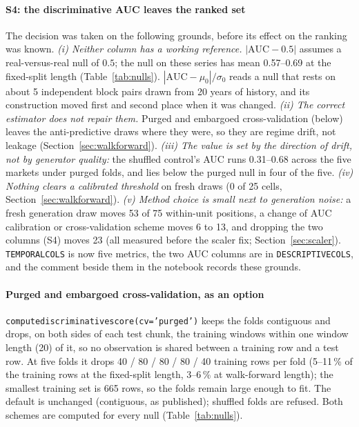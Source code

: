 \documentclass[11pt,a4paper]{article}
\makeatletter
\DeclareRobustCommand{\_}{\ifmmode\nfss@text{\textunderscore}\else\textunderscore\allowbreak\fi}
\makeatother
\begin{document}
\paragraph{S4: the discriminative AUC leaves the ranked set}\label{sec:s4} The decision was taken on the following grounds, before its effect on the ranking was known. \textit{(i) Neither column has a working reference.} $|\mathrm{AUC}-0.5|$ assumes a real-versus-real null of $0.5$; the null on these series has mean 0.57--0.69 at the fixed-split length (Table~\ref{tab:nulls}). $|\mathrm{AUC}-\mu_0|/\sigma_0$ reads a null that rests on about 5 independent block pairs drawn from 20 years of history, and its construction moved first and second place when it was changed. \textit{(ii) The correct estimator does not repair them.} Purged and embargoed cross-validation (below) leaves the anti-predictive draws where they were, so they are regime drift, not leakage (Section~\ref{sec:walkforward}). \textit{(iii) The value is set by the direction of drift, not by generator quality:} the shuffled control's AUC runs 0.31--0.68 across the five markets under purged folds, and lies below the purged null in four of the five. \textit{(iv) Nothing clears a calibrated threshold} on fresh draws (0 of 25 cells, Section~\ref{sec:walkforward}). \textit{(v) Method choice is small next to generation noise:} a fresh generation draw moves 53 of 75 within-unit positions, a change of AUC calibration or cross-validation scheme moves 6 to 13, and dropping the two columns (S4) moves 23 (all measured before the scaler fix; Section~\ref{sec:scaler}). \texttt{TEMPORAL\_COLS} is now five metrics, the two AUC columns are in \texttt{DESCRIPTIVE\_COLS}, and the comment beside them in the notebook records these grounds.

\paragraph{Purged and embargoed cross-validation, as an option}\label{sec:purged} \texttt{compute\_discriminative\_score(cv='purged')} keeps the folds contiguous and drops, on both sides of each test chunk, the training windows within one window length (20) of it, so no observation is shared between a training row and a test row. At five folds it drops 40 / 80 / 80 / 80 / 40 training rows per fold (5--11\,\% of the training rows at the fixed-split length, 3--6\,\% at walk-forward length); the smallest training set is 665 rows, so the folds remain large enough to fit. The default is unchanged (contiguous, as published); shuffled folds are refused. Both schemes are computed for every null (Table~\ref{tab:nulls}).
\end{document}
